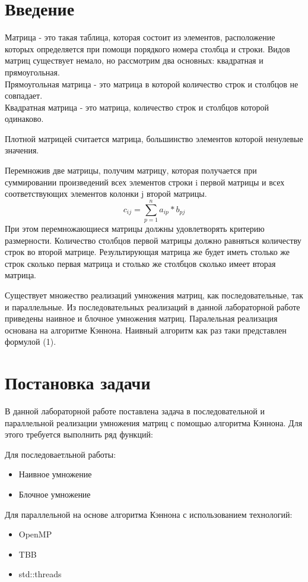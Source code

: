 \documentclass{report}
\begin{document}
\setcounter{page}{2}

\tableofcontents
\newpage

\section*{Введение}
\par Матрица - это такая таблица, которая состоит из элементов, расположение которых определяется при помощи порядкого номера столбца и строки. Видов матриц существует немало, но рассмотрим два основных: квадратная и прямоугольная.\\
Прямоугольная матрица - это матрица в которой количество строк и столбцов не совпадает.\\
Квадратная матрица - это матрица, количество строк и столбцов которой одинаково.
\par Плотной матрицей считается матрица, большинство элементов которой ненулевые значения.
\par Перемножив две матрицы, получим матрицу, которая получается при суммировании произведений всех элементов строки i первой матрицы и всех соответствующих элементов колонки j второй матрицы.
\begin{equation}\label{eq:mult}
c_{ij} =  \sum \limits_{p=1}^{n} a_{ip} * b_{pj}
\end{equation}
При этом перемножающиеся матрицы должны удовлетворять критерию размерности. Количество столбцов первой матрицы должно равняться количеству строк во второй матрице. Результирующая матрица же будет иметь столько же строк сколько первая матрица и столько же столбцов сколько имеет вторая матрица.
\par Существует множество реализаций умножения матриц, как последовательные, так и параллельные. Из последовательных реализаций в данной лабораторной работе приведены наивное и блочное умножения матриц. Паралельная реализация основана на алгоритме Кэннона. Наивный алгоритм как раз таки представлен формулой (1).

\newpage

\section*{Постановка задачи}
В данной лабораторной работе поставлена задача в последовательной и параллельной реализации умножения матриц  с помощью алгоритма Кэннона. Для этого требуется выполнить ряд функций:
\par Для последоваетльной работы:
\begin{itemize}
\item Наивное умножение
\item Блочное умножение
\end{itemize}
\par Для параллельной на основе алгоритма Кэннона с использованием технологий:
\begin{itemize}
\item OpenMP
\item TBB
\item std::threads
\end{itemize}
\newpage
\end{document}

